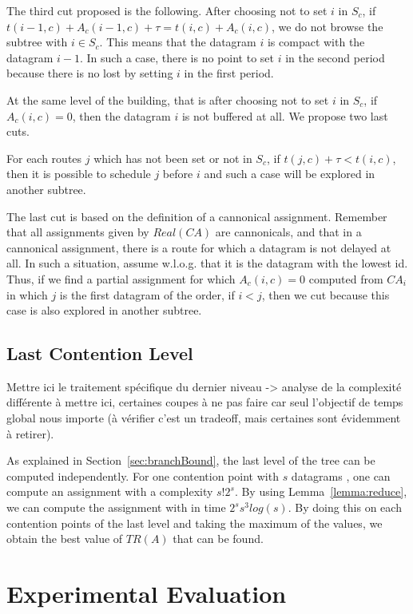 The third cut proposed is the following. After choosing not to set $i$ in $S_c$, if $t(i-1,c) + A_{c}(i-1,c) + \tau = t(i,c) + A_{c}(i,c)$, we do not browse the subtree with $i \in S_c$. This means that the datagram $i$ is compact with the datagram $i-1$. In such a case, there is no point to set $i$ in the second period because there is no lost by setting $i$ in the first period.

At the same level of the building, that is after choosing not to set $i$ in $S_c$, if $A_{c}(i,c) = 0$, then the datagram $i$ is not buffered at all. We propose two last cuts.

For each routes $j$ which has not been set or not in $S_c$, if $t(j,c) + \tau < t(i,c)$, then it is possible to schedule $j$ before $i$ and such a case will be explored in another subtree.

The last cut is based on the definition of a cannonical assignment. Remember that all assignments given by $Real(CA)$ are cannonicals, and that in a cannonical assignment, there is a route for which a datagram is not delayed at all. In such a situation, assume w.l.o.g. that it is the datagram with the lowest id. Thus, if we find a partial assignment for which $A_{c}(i,c) = 0$ computed from $CA_i$ in which $j$ is the first datagram of the order, if $i<j$, then we cut because this case is also explored in another subtree.



\subsection{Last Contention Level}
Mettre ici le traitement spécifique du dernier niveau -> analyse de la complexité différente 
à mettre ici, certaines coupes à ne pas faire car seul l'objectif de temps global nous importe 
(à vérifier c'est un tradeoff, mais certaines sont évidemment à retirer). 


As explained in Section~\ref{sec:branchBound}, the last level of the tree can be computed independently. For one contention point with $s$ datagrams , one can compute an assignment with a complexity $s!2^{s}$. By using Lemma~\ref{lemma:reduce}, we can compute the assignment with \ASPMLS in time $2^ss^3log(s)$. By doing this on each contention points of the last level and taking the maximum of the values, we obtain the best value of $TR(A)$ that can be found.

\section{Experimental Evaluation}

